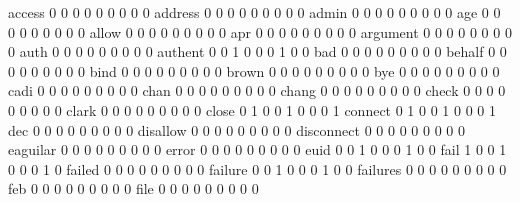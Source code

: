 \documentclass[compress,8pt]{beamer}
\begin{document}
\begin{frame}
\begin{Schunk}
  access                                     0   0   0   0   0   0   0   0   0
  address                                    0   0   0   0   0   0   0   0   0
  admin                                      0   0   0   0   0   0   0   0   0
  age                                        0   0   0   0   0   0   0   0   0
  allow                                      0   0   0   0   0   0   0   0   0
  apr                                        0   0   0   0   0   0   0   0   0
  argument                                   0   0   0   0   0   0   0   0   0
  auth                                       0   0   0   0   0   0   0   0   0
  authent                                    0   0   1   0   0   0   1   0   0
  bad                                        0   0   0   0   0   0   0   0   0
  behalf                                     0   0   0   0   0   0   0   0   0
  bind                                       0   0   0   0   0   0   0   0   0
  brown                                      0   0   0   0   0   0   0   0   0
  bye                                        0   0   0   0   0   0   0   0   0
  cadi                                       0   0   0   0   0   0   0   0   0
  chan                                       0   0   0   0   0   0   0   0   0
  chang                                      0   0   0   0   0   0   0   0   0
  check                                      0   0   0   0   0   0   0   0   0
  clark                                      0   0   0   0   0   0   0   0   0
  close                                      0   1   0   0   1   0   0   0   1
  connect                                    0   1   0   0   1   0   0   0   1
  dec                                        0   0   0   0   0   0   0   0   0
  disallow                                   0   0   0   0   0   0   0   0   0
  disconnect                                 0   0   0   0   0   0   0   0   0
  eaguilar                                   0   0   0   0   0   0   0   0   0
  error                                      0   0   0   0   0   0   0   0   0
  euid                                       0   0   1   0   0   0   1   0   0
  fail                                       1   0   0   1   0   0   0   1   0
  failed                                     0   0   0   0   0   0   0   0   0
  failure                                    0   0   1   0   0   0   1   0   0
  failures                                   0   0   0   0   0   0   0   0   0
  feb                                        0   0   0   0   0   0   0   0   0
  file                                       0   0   0   0   0   0   0   0   0

\end{Schunk}
\end{frame}
\end{document}
